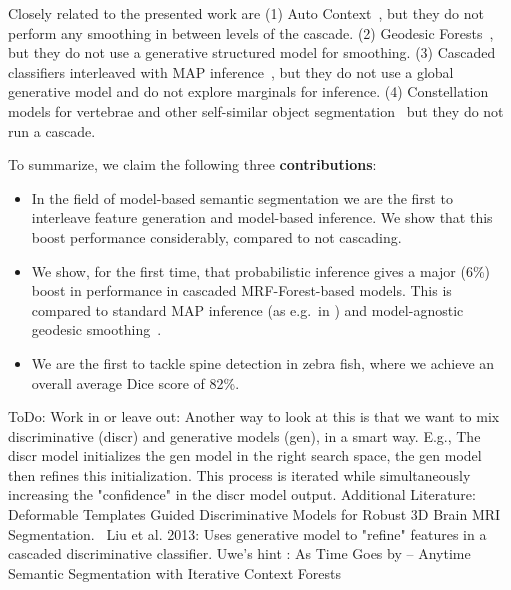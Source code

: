 \documentclass[10pt,twocolumn,letterpaper]{article}
\begin{document}
Closely related to the presented work are 
(1) Auto Context~\cite{AutoContext2008}, but they do not perform any smoothing in between levels of the cascade. 
(2) Geodesic Forests~\cite{GeoForests2013}, but they do not use a generative structured model for smoothing. 
(3) Cascaded classifiers interleaved with MAP inference~\cite{}, but they do not use a global generative model and do not explore marginals for inference. 
(4) Constellation models for vertebrae and other self-similar object segmentation~\cite{Glocker2012,Glocker2013,Klinder2009471,TeethMICCAI2012,WormMiccai2014} but they do not run a cascade. 

To summarize, we claim the following three {\bf contributions}:
\begin{itemize}
\item In the field of model-based semantic segmentation we are the first to interleave feature generation and model-based inference. We show that this boost performance considerably, compared to not cascading. 
\item We show, for the first time, that probabilistic inference gives a major (6\%) boost in performance in cascaded MRF-Forest-based models. This is compared to standard MAP inference (as e.g.\ in \cite{Glocker2013,SeifertAnatomicalSPIE2009,TeethMICCAI2012}) and model-agnostic geodesic smoothing~\cite{GeoForests2013}. 
\item We are the first to tackle spine detection in zebra fish, where we achieve an overall average Dice score of 82\%.
\end{itemize}



ToDo: Work in or leave out:
%
Another way to look at this is that we want to mix discriminative (discr) and generative models (gen), in a smart way.  E.g., The discr model initializes the gen model in the right search space, the gen model then refines this initialization.  This process is iterated while simultaneously increasing the "confidence" in the discr model output. 
%
Additional Literature: 
%
Deformable Templates Guided Discriminative Models for Robust 3D Brain MRI Segmentation.~\cite{BrainSeg2013}  Liu et al.  2013: Uses generative model to "refine" features in a cascaded discriminative classifier.
%
Uwe's hint \cite{Denzler2012}: As Time Goes by -- Anytime Semantic Segmentation with Iterative Context Forests
\end{document}
